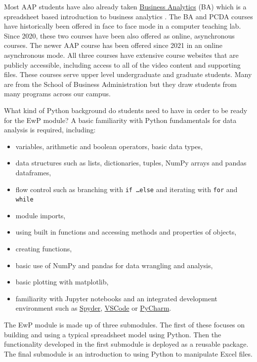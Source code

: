 \documentclass[ited,blindrev]{informs3}              %
\begin{document}
Most AAP students have also already taken   \href{http://www.sba.oakland.edu/faculty/isken/courses/ba}{Business Analytics} (BA) which is a spreadsheet based introduction to business analytics \citep{isken2003:muddy,isken2014:lab}. The BA and PCDA courses have historically been offered in face to face mode in a computer teaching lab. Since 2020, these two courses have been also offered as online, asynchronous courses. The newer AAP course has been offered since 2021 in an online asynchronous mode. All three courses have extensive course websites that are publicly accessible, including access to all of the video content and supporting files. These courses serve upper level undergraduate and graduate students. Many are from the School of Business Administration but they draw students from many programs across our campus. 

What kind of Python background do students need to have in order to be ready for the EwP module? A basic familiarity with Python fundamentals for data analysis is required, including:

\begin{itemize}
	\item variables, arithmetic and boolean operators, basic data types,
	\item data structures such as lists, dictionaries, tuples, NumPy arrays and pandas dataframes,
	\item flow control such as branching with \texttt{if \ldots else} and iterating with \texttt{for} and \texttt{while}
	\item module imports,
	\item using built in functions and accessing methods and properties of objects,
	\item creating functions,
	\item basic use of NumPy and pandas for data wrangling and analysis,
	\item basic plotting with matplotlib,
	\item familiarity with Jupyter notebooks and an integrated development environment such as \href{https://www.spyder-ide.org/}{Spyder}, \href{https://code.visualstudio.com/}{VSCode} or \href{https://www.jetbrains.com/pycharm/}{PyCharm}.
\end{itemize}

The EwP module is made up of three submodules. The first of these focuses on building and using a typical spreadsheet model using Python. Then the functionality developed in the first submodule is deployed as a reusable package. The final submodule is an introduction to using Python to manipulate Excel files.
\end{document}

